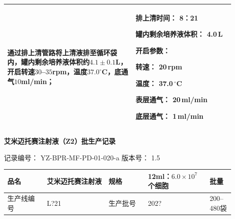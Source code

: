 \documentclass[UTF8,10pt,a4paper,fontset=fandol]{ctexart}
\newcommand{\fieldvalue}[1]{#1}
\newcommand{\handwritten}[1]{#1}
\begin{document}
\begin{tabular}{|p{0.52\linewidth}|p{0.40\linewidth}|}
通过排上清管路将上清液排至循环袋内，罐内剩余培养液体积约$4.1\pm0.1$L，开启转速$30$--$35$rpm，温度$37.0^\circ$C，底通气$10$ml/min；
&
排上清时间：
\fieldvalue{\handwritten{8：21}}

罐内剩余培养液体积：
\fieldvalue{\handwritten{4.0}}\,L

开启参数：

转速：
\fieldvalue{\handwritten{20}}\,rpm

温度：
\fieldvalue{\handwritten{37.0}}\,${}^\circ$C

表层通气：
\fieldvalue{\handwritten{20}}\,ml/min

底层通气：
\fieldvalue{\handwritten{1}}\,ml/min\\
\hline
\end{tabular}
\normalsize

\newpage

\begin{center}
\textbf{艾米迈托赛注射液（Z2）批生产记录}
\end{center}

\noindent
记录编号：
\fieldvalue{YZ-BPR-MF-PD-01-020-a}
\hfill
版本号：
\fieldvalue{1.5}

\begin{tabular}{|p{0.16\linewidth}|p{0.25\linewidth}|p{0.16\linewidth}|p{0.25\linewidth}|p{0.10\linewidth}|}
\hline
品名 &
\fieldvalue{艾米迈托赛注射液} &
规格 &
\fieldvalue{12ml：$6.0\times10^7$个细胞} &
批量 \\
\hline
生产线编号 &
\fieldvalue{\handwritten{L?21}} &
生产批号 &
\fieldvalue{\handwritten{202?}} &
\fieldvalue{200--480袋} \\
\hline
\end{tabular}
\end{document}
